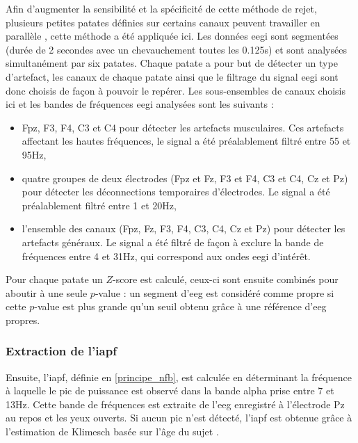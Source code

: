 Afin d'augmenter la sensibilité et la spécificité de cette méthode de rejet, plusieurs petites patates définies sur certains canaux peuvent travailler en parallèle \citep{Barthelemy2019}, 
cette méthode a été appliquée ici.
Les données \gls{eegi} sont segmentées (durée de 2 secondes avec un chevauchement toutes les 0.125s) et sont analysées simultanément par six patates. Chaque patate a pour but de détecter 
un type d'artefact, les canaux de chaque patate ainsi que le filtrage du signal \gls{eegi} sont donc choisis de façon à pouvoir le repérer. 
Les sous-ensembles de canaux choisis ici et les bandes de fréquences \gls{eegi} analysées sont les suivants :
\begin{itemize}
\item Fpz, F3, F4, C3 et C4 pour détecter les artefacts musculaires. Ces artefacts affectant les hautes fréquences, le signal a été préalablement filtré entre 55 et 95Hz,
\item quatre groupes de deux électrodes (Fpz et Fz, F3 et F4, C3 et C4, Cz et Pz) pour détecter les déconnections temporaires d'électrodes. Le signal a été préalablement filtré entre 1 et 20Hz, 
\item l'ensemble des canaux (Fpz, Fz, F3, F4, C3, C4, Cz et Pz) pour détecter les artefacts généraux. Le signal a été filtré de façon à exclure la bande de fréquences entre 4 et 31Hz, qui correspond
aux ondes \gls{eegi} d'intérêt.
\end{itemize}
Pour chaque patate un $Z$-score est calculé, ceux-ci sont ensuite combinés pour aboutir à une seule $p$-value : un segment d'\gls{eeg} est considéré comme propre si cette $p$-value est 
plus grande qu'un seuil obtenu grâce à une référence d'\gls{eeg} propres. 

\subsubsection{Extraction de l'\gls{iapf}} \label{extraction_iapf}
Ensuite, l'\gls{iapf}, définie en \ref{principe_nfb}, est calculée en déterminant la fréquence à laquelle le pic de puissance est observé dans la bande alpha prise entre 7 et 13Hz.
Cette bande de fréquences est extraite de l'\gls{eeg} enregistré à l'électrode Pz au repos et les yeux ouverts. 
Si aucun pic n'est détecté, l'\gls{iapf} est obtenue grâce à l'estimation de Klimesch basée sur l'âge du sujet \citep{Klimesch1999}. 

